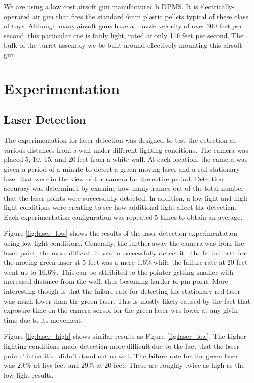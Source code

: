 \documentclass[10pt,twocolumn,letterpaper]{article}
\begin{document}
We are using a low cost airsoft gun manufactured b DPMS. It is electrically-operated air gun that fires the standard 6mm plastic pellets typical of these class of toys. Although many airsoft guns have a muzzle velocity of over 300 feet per second, this particular one is fairly light, rated at only 110 feet per second. The bulk of the turret assembly we be built around effectively mounting this airsoft gun.


\section{Experimentation}

\subsection{Laser Detection}

The experimentation for laser detection was designed to test the detection at various distances from a wall under different lighting conditions. The camera was placed 5, 10, 15, and 20 feet from a white wall. At each location, the camera was given a period of a minute to detect a green moving laser and a red stationary laser that were in the view of the camera for the entire period. Detection accuracy was determined by examine how many frames out of the total number that the laser points were successfully detected. In addition, a low light and high light conditions were creating to see how additional light affect the detection. Each experimentation configuration was repeated 5 times to obtain an average.

Figure \ref{fig:laser_low} shows the results of the laser detection experimentation using low light conditions. Generally, the further away the camera was from the laser point, the more difficult it was to successfully detect it. The failure rate for the moving green laser at 5 feet was a mere 1.6\% while the failure rate at 20 feet went up to 16.6\%. This can be attribited to the pointer getting smaller with increased distance from the wall, thus becoming harder to pin point. More interesting though is that the failure rate for detecting the stationary red laser was much lower than the green laser. This is mostly likely caused by the fact that exposure time on the camera sensor for the green laser was lower at any givin time due to its movement.  

Figure \ref{fig:laser_high} shows similar results as Figure \ref{fig:laser_low}. The higher lighting conditions made detection more difficult due to the fact that the laser points' intensities didn't stand out as well. The failure rate for the green laser was 2.6\% at five feet and 29\% at 20 feet. These are roughly twice as high as the low light results.
\end{document}
